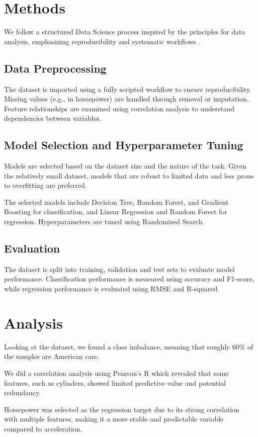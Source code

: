 \documentclass[a4paper, twocolumn]{article}
\begin{document}
\section{Methods}
We follow a structured Data Science process inspired by the principles for data analysis, emphasizing reproducibility and systematic workflows \cite{stoudt2021principles}.

\subsection{Data Preprocessing}
The dataset is imported using a fully scripted workflow to ensure reproducibility. Missing values (e.g., in horsepower) are handled through removal or imputation. Feature relationships are examined using correlation analysis to understand dependencies between variables.

\subsection{Model Selection and Hyperparameter Tuning}
Models are selected based on the dataset size and the nature of the task. Given the relatively small dataset, models that are robust to limited data and less prone to overfitting are preferred.

The selected models include Decision Tree, Random Forest, and Gradient Boosting for classification, and Linear Regression and Random Forest for regression. Hyperparameters are tuned using Randomized Search.
\subsection{Evaluation}
The dataset is split into training, validation and test sets to evaluate model performance. Classification performance is measured using accuracy and F1-score,  while regression performance is evaluated using RMSE and R-squared.
\section{Analysis}
Looking at the dataset, we found a class imbalance, meaning that roughly 60\% of the samples are American cars.

We did a correlation analysis using Pearson's R which revealed that some features, such as cylinders, showed limited predictive value and potential redundancy. 

Horsepower was selected as the regression target due to its strong correlation with multiple features, making it a more stable and predictable variable compared to acceleration.
\end{document}
